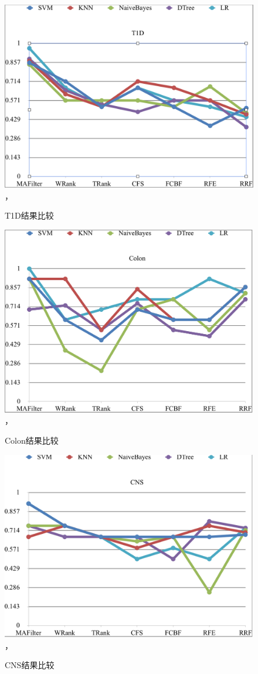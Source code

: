 \documentclass{njubachelor}
\begin{document}
\begin{figure}[!ht]
  \centering
  \includegraphics[width=5in]{pic/fig10}， 
  \caption{T1D结果比较}
\end{figure}

\begin{figure}[!ht]
  \centering
  \includegraphics[width=5in]{pic/fig11}， 
  \caption{Colon结果比较}
\end{figure}

\begin{figure}[!ht]
  \centering
  \includegraphics[width=5in]{pic/fig12}， 
  \caption{CNS结果比较}
\end{figure}
\end{document}
